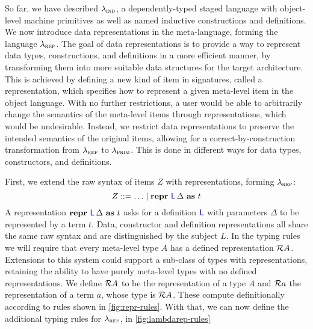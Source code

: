 So far, we have described $\lambda_{\textsc{ind}}$, a dependently-typed staged language
with object-level machine primitives as well as named inductive constructions
and definitions. We now introduce data representations in the meta-language,
forming the language $\lambda_{\textsc{rep}}$. The goal of data representations is to
provide a way to represent data types, constructions, and definitions in a more
efficient manner, by transforming them into more suitable data structures for
the target architecture. This is achieved by defining a new kind of item in
signatures, called a representation, which specifies how to represent a given
meta-level item in the object language. With no further restrictions, a user
would be able to arbitrarily change the semantics of the meta-level items
through representations, which would be undesirable. Instead, we restrict data
representations to preserve the intended semantics of the original items,
allowing for a correct-by-construction transformation from $\lambda_{\textsc{rep}}$ to
$\lambda_{\textsc{prim}}$. This is done in different ways for data types, constructors, and
definitions.

First, we extend the raw syntax of items $Z$ with representations, forming
$\lambda_{\textsc{rep}}$:
\[
  Z ::= \ldots \mid \textbf{repr} \ {\color{blue}{\mathsf{L}}}\, {\Delta}\ \textbf{as}\ {t}
\]
A representation $\textbf{repr} \ {\color{blue}{\mathsf{L}}}\, {\Delta}\ \textbf{as}\ {t}$ asks for a definition ${\color{blue}{\mathsf{L}}}$ with
parameters $\Delta$ to be represented by a term $t$. Data, constructor and
definition representations all share the same raw syntax and are distinguished
by the subject $L$. In the typing rules we will require that every meta-level
type $A$ has a defined representation $\mathcal{R} {A}$. Extensions to this system
could support a sub-class of types with representations, retaining the ability
to have purely meta-level types with no defined representations. We define
$\mathcal{R} {A}$ to be the representation of a type $A$ and $\mathcal{R} {a}$ the
representation of a term $a$, whose type is $\mathcal{R} {A}$. These compute
definitionally according to rules shown in \cref{fig:repr-rules}. With that, we
can now define the additional typing rules for $\lambda_{\textsc{rep}}$, in
\cref{fig:lambdarep-rules}

